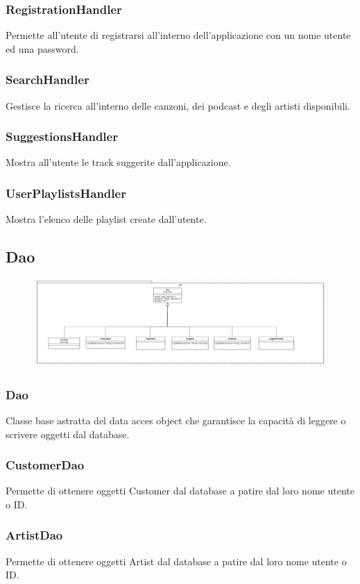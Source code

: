 \documentclass{article}
\begin{document}
  \subsubsection{RegistrationHandler}
  Permette all'utente di registrarsi all'interno dell'applicazione con un
  nome utente ed una password.
  \subsubsection{SearchHandler}
  Gestisce la ricerca all'interno delle canzoni, dei podcast e degli artisti disponibili.
  \subsubsection{SuggestionsHandler}
  Mostra all'utente le track suggerite dall'applicazione.
  \subsubsection{UserPlaylistsHandler}
  Mostra l'elenco delle playlist create dall'utente.

  \subsection{Dao}

  \begin{figure}[H]
    \includegraphics[scale=0.3]{dao01}
  \end{figure}

  \subsubsection{Dao}
  Classe base astratta del data acces object che garantisce la capacità di leggere
  o scrivere oggetti dal database.
  \subsubsection{CustomerDao}
  Permette di ottenere oggetti Customer dal database a patire dal loro nome utente o ID.
  \subsubsection{ArtistDao}
  Permette di ottenere oggetti Artist dal database a patire dal loro nome utente o ID.
\end{document}
